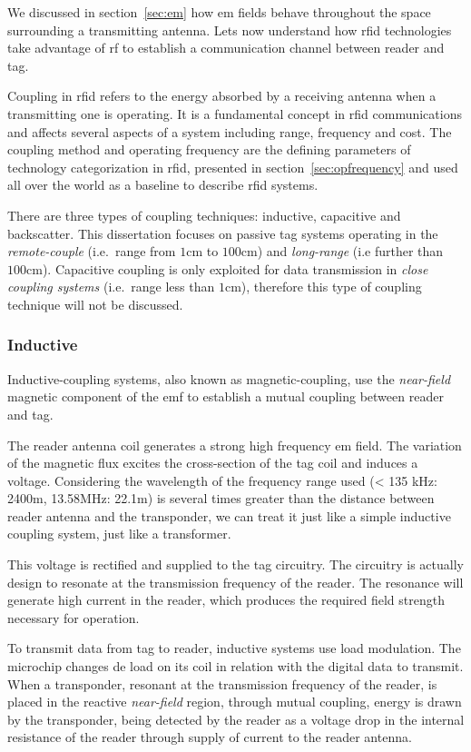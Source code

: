We discussed in section~\ref{sec:em} how \acl{em} fields behave throughout the space surrounding a transmitting antenna. Lets now understand how \ac{rfid} technologies take advantage of \acl{rf} to establish a communication channel between reader and tag.

Coupling in \ac{rfid} refers to the energy absorbed by a receiving antenna when a transmitting one is operating. 
It is a fundamental concept in \ac{rfid} communications and affects several aspects of a system including range, frequency and cost.
The coupling method and operating frequency are the defining parameters of technology categorization in \ac{rfid}, presented in section~\ref{sec:opfrequency} and used all over the world as a baseline to describe \ac{rfid} systems.

There are three types of coupling techniques: inductive, capacitive and backscatter. 
This dissertation focuses on passive tag systems operating in the \emph{remote-couple} (i.e.\ range from $1$cm to $100$cm) and \emph{long-range} (i.e further than $100$cm).
Capacitive coupling is only exploited for data transmission in \emph{close coupling systems} (i.e.\ range less than $1$cm), therefore this type of coupling technique will not be discussed.

\subsubsection{Inductive}

Inductive-coupling systems, also known as magnetic-coupling, use the \emph{near-field} magnetic component of the \ac{emf} to establish a mutual coupling between reader and tag.

The reader antenna coil generates a strong high frequency \ac{em} field. The variation of the magnetic flux excites the cross-section of the tag coil and induces a voltage.
Considering the wavelength of the frequency range used (< 135 kHz: 2400m, 13.58MHz: 22.1m) is several times greater than the distance between reader antenna and the transponder, we can treat it just like a simple inductive coupling system, just like a transformer.

This voltage is rectified and supplied to the tag circuitry.
The circuitry is actually design to resonate at the transmission frequency of the reader. The resonance will generate high current in the reader, which produces the required field strength necessary for operation.

To transmit data from tag to reader, inductive systems use load modulation. The microchip changes de load on its coil in relation with the digital data to transmit. When a transponder, resonant at the transmission frequency of the reader, is placed in the reactive \emph{near-field} region, through mutual coupling, energy is drawn by the transponder, being detected by the reader as a voltage drop in the internal resistance of the reader through supply of current to the reader antenna.

